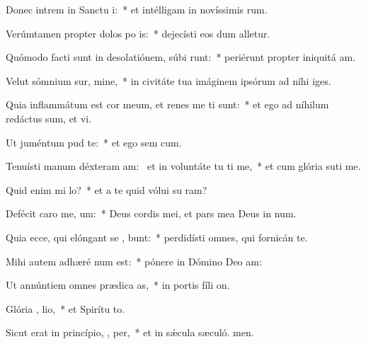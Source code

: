 \item Donec intrem in Sanctu i:~* et intélligam in novíssimis rum.
\item Verúmtamen propter dolos po is:~* dejecísti eos dum alletur.
\item Quómodo facti sunt in desolatiónem, súbi runt:~* periérunt propter iniquitá am.
\item Velut sómnium sur, mine,~* in civitáte tua imáginem ipsórum ad níhi iges.
\item Quia inflammátum est cor meum, et renes me ti sunt:~* et ego ad níhilum redáctus sum, et vi.
\item Ut juméntum   pud te:~* et ego sem cum.
\item Tenuísti manum déxteram am:~\pscross{} et in voluntáte tu ti me,~* et cum glória suti me.
\item Quid enim mi   lo?~* et a te quid vólui su ram?
\item Defécit caro me,   um:~* Deus cordis mei, et pars mea Deus in num.
\item Quia ecce, qui elóngant se  , bunt:~* perdidísti omnes, qui fornicán  te.
\item Mihi autem adhæré  num est:~* pónere in Dómino Deo  am:
\item Ut annúntiem omnes prædica as,~* in portis fíli on.
\item Glória ,  lio,~* et Spirítu to.
\item Sicut erat in princípio,  ,  per,~* et in sǽcula sæculó. men.
